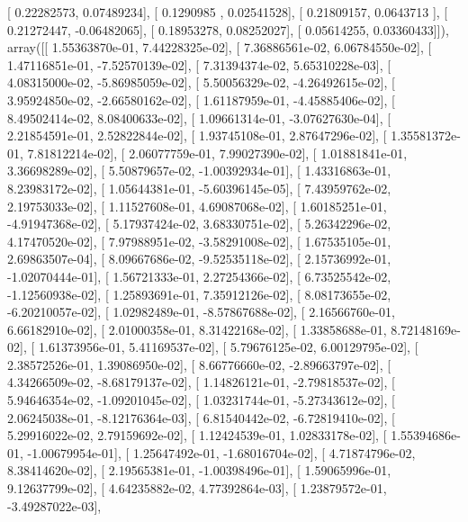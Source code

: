 \documentclass{article}
\begin{document}
       [ 0.22282573,  0.07489234],
       [ 0.1290985 ,  0.02541528],
       [ 0.21809157,  0.0643713 ],
       [ 0.21272447, -0.06482065],
       [ 0.18953278,  0.08252027],
       [ 0.05614255,  0.03360433]]), array([[  1.55363870e-01,   7.44228325e-02],
       [  7.36886561e-02,   6.06784550e-02],
       [  1.47116851e-01,  -7.52570139e-02],
       [  7.31394374e-02,   5.65310228e-03],
       [  4.08315000e-02,  -5.86985059e-02],
       [  5.50056329e-02,  -4.26492615e-02],
       [  3.95924850e-02,  -2.66580162e-02],
       [  1.61187959e-01,  -4.45885406e-02],
       [  8.49502414e-02,   8.08400633e-02],
       [  1.09661314e-01,  -3.07627630e-04],
       [  2.21854591e-01,   2.52822844e-02],
       [  1.93745108e-01,   2.87647296e-02],
       [  1.35581372e-01,   7.81812214e-02],
       [  2.06077759e-01,   7.99027390e-02],
       [  1.01881841e-01,   3.36698289e-02],
       [  5.50879657e-02,  -1.00392934e-01],
       [  1.43316863e-01,   8.23983172e-02],
       [  1.05644381e-01,  -5.60396145e-05],
       [  7.43959762e-02,   2.19753033e-02],
       [  1.11527608e-01,   4.69087068e-02],
       [  1.60185251e-01,  -4.91947368e-02],
       [  5.17937424e-02,   3.68330751e-02],
       [  5.26342296e-02,   4.17470520e-02],
       [  7.97988951e-02,  -3.58291008e-02],
       [  1.67535105e-01,   2.69863507e-04],
       [  8.09667686e-02,  -9.52535118e-02],
       [  2.15736992e-01,  -1.02070444e-01],
       [  1.56721333e-01,   2.27254366e-02],
       [  6.73525542e-02,  -1.12560938e-02],
       [  1.25893691e-01,   7.35912126e-02],
       [  8.08173655e-02,  -6.20210057e-02],
       [  1.02982489e-01,  -8.57867688e-02],
       [  2.16566760e-01,   6.66182910e-02],
       [  2.01000358e-01,   8.31422168e-02],
       [  1.33858688e-01,   8.72148169e-02],
       [  1.61373956e-01,   5.41169537e-02],
       [  5.79676125e-02,   6.00129795e-02],
       [  2.38572526e-01,   1.39086950e-02],
       [  8.66776660e-02,  -2.89663797e-02],
       [  4.34266509e-02,  -8.68179137e-02],
       [  1.14826121e-01,  -2.79818537e-02],
       [  5.94646354e-02,  -1.09201045e-02],
       [  1.03231744e-01,  -5.27343612e-02],
       [  2.06245038e-01,  -8.12176364e-03],
       [  6.81540442e-02,  -6.72819410e-02],
       [  5.29916022e-02,   2.79159692e-02],
       [  1.12424539e-01,   1.02833178e-02],
       [  1.55394686e-01,  -1.00679954e-01],
       [  1.25647492e-01,  -1.68016704e-02],
       [  4.71874796e-02,   8.38414620e-02],
       [  2.19565381e-01,  -1.00398496e-01],
       [  1.59065996e-01,   9.12637799e-02],
       [  4.64235882e-02,   4.77392864e-03],
       [  1.23879572e-01,  -3.49287022e-03],
\end{document}
